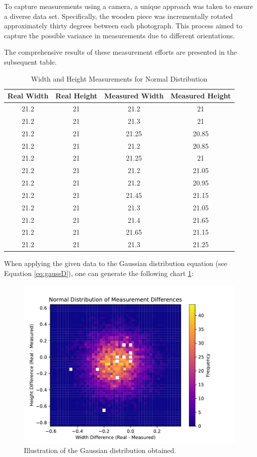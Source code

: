 To capture measurements using a camera, a unique approach was taken to ensure a diverse data set. Specifically, the wooden piece was incrementally rotated approximately thirty degrees between each photograph. This process aimed to capture the possible variance in measurements due to different orientations. 

The comprehensive results of these measurement efforts are presented in the subsequent table.

\begin{table}[h]
\centering
\label{table:data}
\begin{tabular}{c c c c }
\hline
\textbf{Real Width} & \textbf{Real Height} & \textbf{Measured Width} & \textbf{Measured Height} \\
\hline
21.2 & 21 & 21.2 & 21 \\
21.2 & 21 & 21.3 & 21 \\
21.2 & 21 & 21.25 & 20.85 \\
21.2 & 21 & 21.2 & 20.85 \\
21.2 & 21 & 21.25 & 21 \\
21.2 & 21 & 21.2 & 21.05 \\
21.2 & 21 & 21.2 & 20.95 \\
21.2 & 21 & 21.45 & 21.15 \\
21.2 & 21 & 21.3 & 21.05 \\
21.2 & 21 & 21.4 & 21.65 \\
21.2 & 21 & 21.65 & 21.15 \\
21.2 & 21 & 21.3 & 21.25 \\
\hline
\end{tabular}
\caption{Width and Height Measurements for Normal Distribution}
\end{table}

When applying the given data to the Gaussian distribution equation (see Equation \ref{eq:gaussD}), one can generate the following chart \ref{fig:normal}:
\begin{figure}
    \centering
    \includegraphics[width=0.65\linewidth]{images/chap5/Normal.pdf}
    \caption{Illustration of the Gaussian distribution obtained.}
    \label{fig:normal}
\end{figure}

